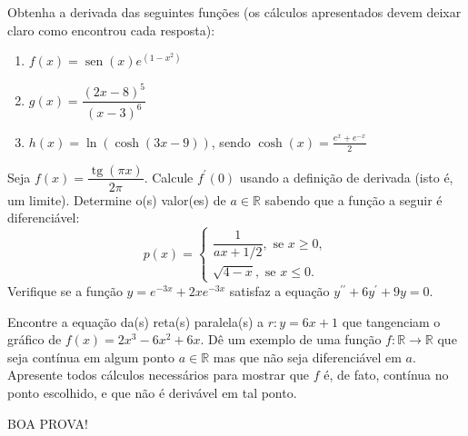 \documentclass[12pt,a4paper]{article}
\newcommand{\fixme}{{\color{red}(...)}}
\newcommand*\sen{\operatorname{sen}}
\newcommand*\tg{\operatorname{tg}}
\newcommand*\R{\mathbb{R}}
\begin{document}
\begin{ExerciseList}
\Exercise[title={2,0}] Obtenha a derivada das seguintes funções (os cálculos apresentados devem deixar claro como encontrou cada resposta):
\begin{multicols}{3}
\begin{enumerate}
\item $f(x) = \sen(x) e^{(1-x^2)}$
\item $g(x) = \dfrac{(2x - 8)^{5}}{(x-3)^{6}}$
\item $h(x) = \ln( \cosh(3x-9) )$, sendo $\cosh(x) = \frac{e^x+e^{-x}}{2}$
\end{enumerate}
\end{multicols}
\Answer \fixme
\Exercise[title={2,0}] Seja $f(x) = \dfrac{ \tg(\pi x) }{ 2\pi }$. Calcule $f^\prime(0)$ usando a definição de derivada (isto é, um limite).
\Answer \fixme
\Exercise[title={2,0}] Determine o(s) valor(es) de $a \in \R$ sabendo que a função a seguir é diferenciável:
\[
p(x) =
\begin{cases}
\dfrac{1}{ax + 1/2}, \text{ se } x \geq 0,\\
\sqrt{4-x}, \text{ se } x \leq 0.
\end{cases}
\]
\Answer \fixme
\Exercise[title={2,0}] Verifique se a função $y = e^{-3x} + 2x e^{-3x}$ satisfaz a equação $y^{\prime\prime} + 6 y^\prime +9y = 0$.

\Answer \fixme
\Exercise[title={2,0}] Encontre a equação da(s) reta(s) paralela(s) a $r: y=6x+1$ que tangenciam o gráfico de $f(x) = 2x^3 - 6x^2 + 6x$.
\Answer \fixme
\Exercise[title={2,0}] Dê um exemplo de uma função $f: \R \to \R$ que seja contínua em algum ponto $a \in \R$ mas que não seja diferenciável em $a$. Apresente todos cálculos necessários para mostrar que $f$ é, de fato, contínua no ponto escolhido, e que não é derivável em tal ponto.
\Answer \fixme
\end{ExerciseList}

\begin{center}
BOA PROVA!
\end{center}

\end{document}
